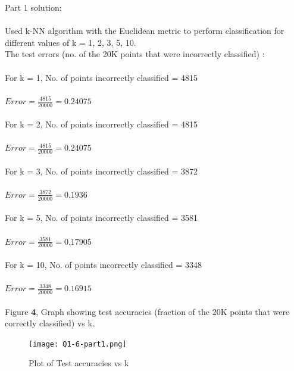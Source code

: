 \documentclass[a4paper,11pt]{article}
\begin{document}
\begin{mlsolution}
Part 1 solution:\\\\
Used k-NN algorithm with the Euclidean metric to perform classification for different values of k = 1, 2, 3, 5, 10.
\\The test errors (no. of the 20K points that were incorrectly classified) :\\\\
For k = 1, No. of points incorrectly classified = 4815\\ \\
\begin{math} Error = \frac{4815}{20000} =  0.24075 \end{math}\\ \\
For k = 2, No. of points incorrectly classified = 4815 \\ \\
\begin{math} Error = \frac{4815}{20000} =  0.24075 \end{math} \\ \\
For k = 3, No. of points incorrectly classified = 3872 \\ \\ 
\begin{math} Error = \frac{3872}{20000} =  0.1936 \end{math} \\ \\
For k = 5, No. of points incorrectly classified = 3581 \\ \\
\begin{math} Error = \frac{3581}{20000} =  0.17905 \end{math} \\ \\
For k = 10, No. of points incorrectly classified = 3348 \\ \\ 
\begin{math} Error = \frac{3348}{20000} =  0.16915 \end{math} \\ \\
Figure \textbf{4}, Graph
showing test accuracies (fraction of the 20K points that were correctly classified) vs k.\\

\begin{figure}[th]%
\centering
\texttt{[image: Q1-6-part1.png]}%
\caption{Plot of Test accuracies vs k }%
\label{fig:accuracy}%
\end{figure}



\end{mlsolution}
\end{document}
